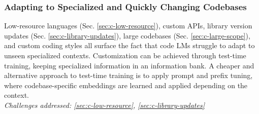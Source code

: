 

\subsubsection{Adapting to Specialized and Quickly Changing Codebases} \label{sec:d-adaptation}

\begin{tcolorbox}[colback=lightorange, boxrule=0pt, arc=5pt, outer arc=5pt]
Low-resource languages (Sec. \ref{sec:c-low-resource}), custom APIs, library version updates (Sec. \ref{sec:c-library-updates}), large codebases (Sec. \ref{sec:c-large-scope}), and custom coding styles all surface the fact that code LMs struggle to adapt to unseen specialized contexts. Customization can be achieved through test-time training, keeping specialized information in an information bank. A cheaper and alternative approach to test-time training is to apply prompt and prefix tuning, where codebase-specific embeddings are learned and applied depending on the context. 
\newline \\
\textit{Challenges addressed: \ref{sec:c-low-resource}, \ref{sec:c-library-updates}}
\end{tcolorbox}




